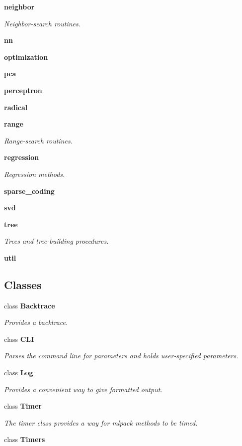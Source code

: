 \begin{DoxyCompactItemize}
 {\bf neighbor}
\begin{DoxyCompactList}\small\item\em Neighbor-\/search routines. \end{DoxyCompactList}\item 
 {\bf nn}
\item 
 {\bf optimization}
\item 
 {\bf pca}
\item 
 {\bf perceptron}
\item 
 {\bf radical}
\item 
 {\bf range}
\begin{DoxyCompactList}\small\item\em Range-\/search routines. \end{DoxyCompactList}\item 
 {\bf regression}
\begin{DoxyCompactList}\small\item\em Regression methods. \end{DoxyCompactList}\item 
 {\bf sparse\+\_\+coding}
\item 
 {\bf svd}
\item 
 {\bf tree}
\begin{DoxyCompactList}\small\item\em Trees and tree-\/building procedures. \end{DoxyCompactList}\item 
 {\bf util}
\end{DoxyCompactItemize}
\subsection*{Classes}
\begin{DoxyCompactItemize}
\item 
class {\bf Backtrace}
\begin{DoxyCompactList}\small\item\em Provides a backtrace. \end{DoxyCompactList}\item 
class {\bf C\+LI}
\begin{DoxyCompactList}\small\item\em Parses the command line for parameters and holds user-\/specified parameters. \end{DoxyCompactList}\item 
class {\bf Log}
\begin{DoxyCompactList}\small\item\em Provides a convenient way to give formatted output. \end{DoxyCompactList}\item 
class {\bf Timer}
\begin{DoxyCompactList}\small\item\em The timer class provides a way for mlpack methods to be timed. \end{DoxyCompactList}\item 
class {\bf Timers}
\end{DoxyCompactItemize}
